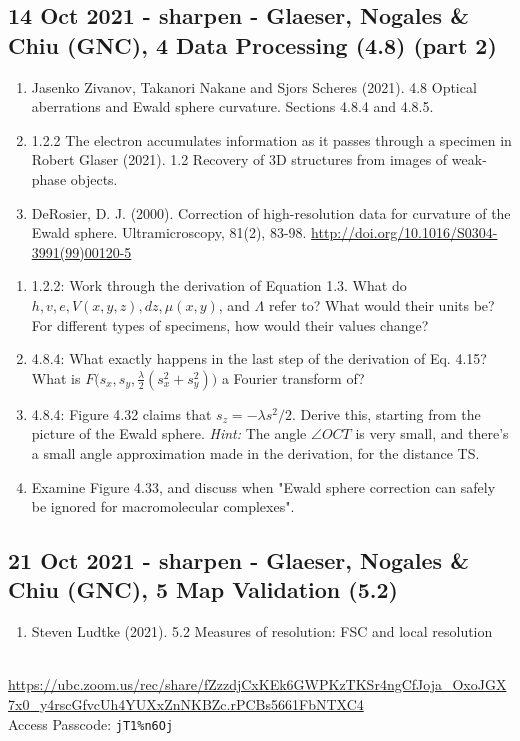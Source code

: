 \documentclass[11pt, oneside]{article}   	%
\begin{document}
\subsection{14 Oct 2021 - sharpen - Glaeser, Nogales \& Chiu (GNC), 4 Data Processing (4.8) (part 2)}
\begin{enumerate}
	\item Jasenko Zivanov, Takanori Nakane and Sjors Scheres (2021). 4.8 Optical aberrations and Ewald sphere curvature. Sections 4.8.4 and 4.8.5.
	\item 1.2.2 The electron accumulates information as it passes through a specimen in Robert Glaser (2021). 1.2 Recovery of 3D structures from images of weak-phase objects.
	\item DeRosier, D. J. (2000). Correction of high-resolution data for curvature of the Ewald sphere. Ultramicroscopy, 81(2), 83-98. \url{http://doi.org/10.1016/S0304-3991(99)00120-5}
\end{enumerate}
\begin{enumerate}
	\item 1.2.2: Work through the derivation of Equation 1.3. What do $h,v,e,V(x,y,z),dz,\mu(x,y)$, and $\Lambda$ refer to? What would their units be? For different types of specimens, how would their values change?
	\item 4.8.4: What exactly happens in the last step of the derivation of Eq. 4.15? What is $F\Big(s_x,s_y,\frac{\lambda}{2}(s_x^2 + s_y^2)\Big)$ a Fourier transform of?
	\item 4.8.4: Figure 4.32 claims that $s_z =- \lambda s^2/2$. Derive this, starting from the picture of the Ewald sphere. {\it Hint:} The angle $\angle OCT$ is very small, and there's a small angle approximation made in the derivation, for the distance TS. 
	\item Examine Figure 4.33, and discuss when "Ewald sphere correction can safely be ignored for macromolecular complexes".
\end{enumerate}

\subsection{21 Oct 2021 - sharpen - Glaeser, Nogales \& Chiu (GNC), 5 Map Validation (5.2)}
\begin{enumerate}
	\item Steven Ludtke (2021). 5.2 Measures of resolution: FSC and local resolution
\end{enumerate}
 \\
{\tiny \url{https://ubc.zoom.us/rec/share/fZzzdjCxKEk6GWPKzTKSr4ngCfJoja_OxoJGX7x0_y4rscGfvcUh4YUXxZnNKBZc.rPCBs5661FbNTXC4}} \\
Access Passcode: \texttt{jT1\%n6Oj}
\end{document}
